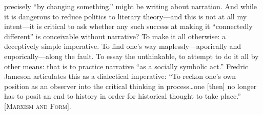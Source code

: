 \documentclass[
]{memoir}
\begin{document}
precisely ``by changing something.'' might be writing about narration.
And while it is dangerous to reduce politics to literary theory---and
this is not at all my intent---it is critical to ask whether any such
success at making it ``connectedly different'' is conceivable without
narrative? To make it all otherwise: a deceptively simple imperative. To
find one's way maplessly---aporically and euporically---along the fault.
To essay the unthinkable, to attempt to do it all by other means: that
is to practice narrative ``as a socially symbolic act.'' Fredric Jameson
articulates this as a dialectical imperative: ``To reckon one's own
position as an observer into the critical thinking in process\ldots{}one
{[}then{]} no longer has to posit an end to history in order for
historical thought to take place.'' {[}\textsc{Marxism and Form}{]}.
\end{document}

